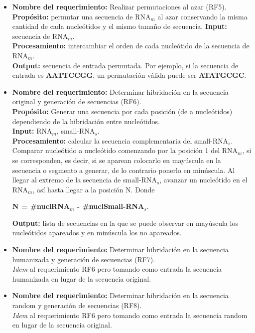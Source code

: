 \documentclass[12pt,a4paper,spanish]{article}
\begin{document}
\begin{itemize}
		\item \textbf{Nombre del requerimiento:} Realizar permutaciones al azar (RF5).\\
 	    \textbf{Propósito:} permutar una secuencia de RNA$_m$ al azar conservando la misma cantidad de cada nucleótidos y el mismo tamaño de 		
							secuencia.							  
		\textbf{Input:} secuencia de RNA$_m$.\\
		\textbf{Procesamiento:} intercambiar el orden de cada nucleótido de la secuencia de RNA$_m$. \\
		\textbf{Output:} secuencia de entrada permutada. Por ejemplo, si la secuencia de entrada es \textbf{AATTCCGG}, un permutación válida puede ser 							\textbf{ATATGCGC}. 	\\

		\item \textbf{Nombre del requerimiento:} Determinar hibridación en la secuencia original y generación de secuencias (RF6).\\
 	    \textbf{Propósito:} Generar una secuencia por cada posición (de a nucleótidos) dependiendo de la hibridación entre nucleótidos. \\
		\textbf{Input:} RNA$_m$, small-RNA$_s$. \\
		\textbf{Procesamiento:} calcular la secuencia complementaria del small-RNA$_s$. Comparar nucleótido a nucleótido comenzando por la posición 1 del 									RNA$_m$, si se corresponden, es decir, si se aparean colocarlo en mayúscula en la secuencia o segmento a generar, de lo 								contrario ponerlo en minúscula. Al llegar al extremo de la secuencia de small-RNA$_s$, avanzar un nucleótido en el RNA$_m$, 									así hasta llegar a la posición N.
								Donde \begin{center} \textbf{N = \#nuclRNA$_m$ - \#nuclSmall-RNA$_s$}. \end{center}
		\textbf{Output:} lista de secuencias en la que se puede observar en mayúscula los nucleótidos apareados y en minúscula los no apareados.\\

		\item \textbf{Nombre del requerimiento:} Determinar hibridación en la secuencia humanizada y generación de secuencias (RF7).\\
		\textit{Idem} al requerimiento RF6 pero tomando como entrada la secuencia humanizada en lugar de la secuencia original. \\

		\item \textbf{Nombre del requerimiento:} Determinar hibridación en la secuencia random y generación de secuencias (RF8).\\
		\textit{Idem} al requerimiento RF6 pero tomando como entrada la secuencia random en lugar de la secuencia original. \\


\end{itemize}
\end{document}
